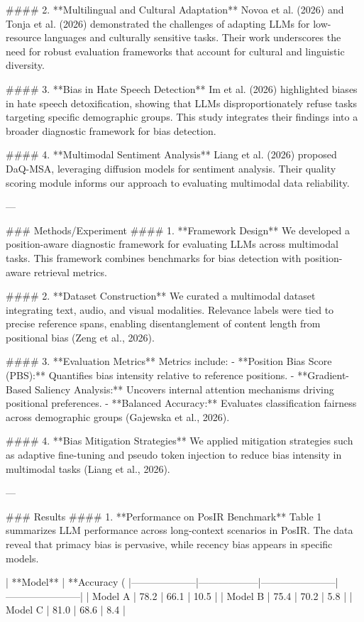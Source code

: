 #### 2. **Multilingual and Cultural Adaptation**  
Novoa et al. (2026) and Tonja et al. (2026) demonstrated the challenges of adapting LLMs for low-resource languages and culturally sensitive tasks. Their work underscores the need for robust evaluation frameworks that account for cultural and linguistic diversity.

#### 3. **Bias in Hate Speech Detection**  
Im et al. (2026) highlighted biases in hate speech detoxification, showing that LLMs disproportionately refuse tasks targeting specific demographic groups. This study integrates their findings into a broader diagnostic framework for bias detection.

#### 4. **Multimodal Sentiment Analysis**  
Liang et al. (2026) proposed DaQ-MSA, leveraging diffusion models for sentiment analysis. Their quality scoring module informs our approach to evaluating multimodal data reliability.

---

### Methods/Experiment  
#### 1. **Framework Design**  
We developed a position-aware diagnostic framework for evaluating LLMs across multimodal tasks. This framework combines benchmarks for bias detection with position-aware retrieval metrics.

#### 2. **Dataset Construction**  
We curated a multimodal dataset integrating text, audio, and visual modalities. Relevance labels were tied to precise reference spans, enabling disentanglement of content length from positional bias (Zeng et al., 2026).

#### 3. **Evaluation Metrics**  
Metrics include:  
- **Position Bias Score (PBS):** Quantifies bias intensity relative to reference positions.  
- **Gradient-Based Saliency Analysis:** Uncovers internal attention mechanisms driving positional preferences.  
- **Balanced Accuracy:** Evaluates classification fairness across demographic groups (Gajewska et al., 2026).  

#### 4. **Bias Mitigation Strategies**  
We applied mitigation strategies such as adaptive fine-tuning and pseudo token injection to reduce bias intensity in multimodal tasks (Liang et al., 2026).

---

### Results  
#### 1. **Performance on PosIR Benchmark**  
Table 1 summarizes LLM performance across long-context scenarios in PosIR. The data reveal that primacy bias is pervasive, while recency bias appears in specific models.

| **Model**         | **Accuracy (%
|--------------------|------------------|-----------------------|-----------------------|  
| Model A           | 78.2            | 66.1                  | 10.5                 |  
| Model B           | 75.4            | 70.2                  | 5.8                  |  
| Model C           | 81.0            | 68.6                  | 8.4                  |  

